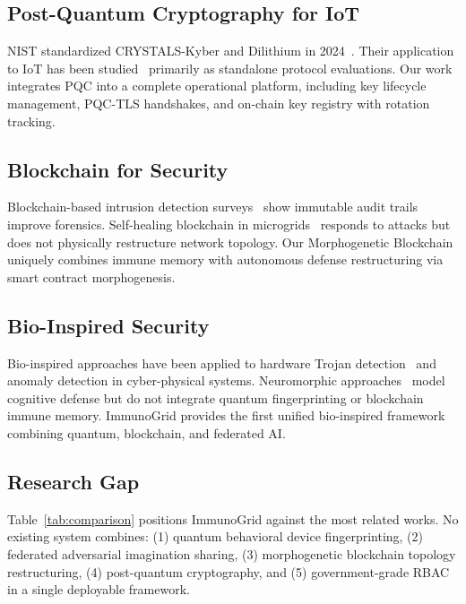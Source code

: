 \subsection{Post-Quantum Cryptography for IoT}

NIST standardized CRYSTALS-Kyber and Dilithium in 2024~\cite{nist2024pqc}.
Their application to IoT has been studied~\cite{khalid2026pqc} primarily as
standalone protocol evaluations. Our work integrates PQC into a complete
operational platform, including key lifecycle management, PQC-TLS handshakes,
and on-chain key registry with rotation tracking.

\subsection{Blockchain for Security}

Blockchain-based intrusion detection surveys~\cite{theodorou2019blockchain}
show immutable audit trails improve forensics. Self-healing blockchain in
microgrids~\cite{hyperledger2018fabric} responds to attacks but does not
physically restructure network topology. Our Morphogenetic Blockchain
uniquely combines immune memory with autonomous defense restructuring via
smart contract morphogenesis.

\subsection{Bio-Inspired Security}

Bio-inspired approaches have been applied to hardware Trojan
detection~\cite{frontiers2025defense} and anomaly detection in cyber-physical
systems. Neuromorphic approaches~\cite{frontiers2025defense} model cognitive
defense but do not integrate quantum fingerprinting or blockchain immune memory.
ImmunoGrid provides the first unified bio-inspired framework combining quantum,
blockchain, and federated AI.

\subsection{Research Gap}

Table~\ref{tab:comparison} positions ImmunoGrid against the most related works.
No existing system combines: (1) quantum behavioral device fingerprinting,
(2) federated adversarial imagination sharing, (3) morphogenetic blockchain
topology restructuring, (4) post-quantum cryptography, and
(5) government-grade RBAC in a single deployable framework.

